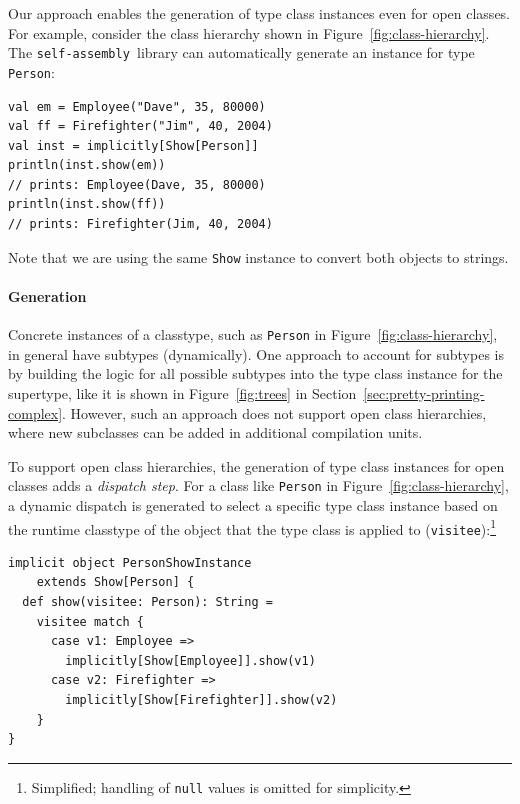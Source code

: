 \documentclass[preprint]{sigplanconf}
\newcommand{\selfassembly}{\texttt{self-assembly~}}
\begin{document}
Our approach enables the generation of type class instances even for open
classes. For example, consider the class hierarchy shown in
Figure~\ref{fig:class-hierarchy}. The \selfassembly library can automatically generate
an instance for type \verb|Person|:

\begin{lstlisting}
val em = Employee("Dave", 35, 80000)
val ff = Firefighter("Jim", 40, 2004)
val inst = implicitly[Show[Person]]
println(inst.show(em))
// prints: Employee(Dave, 35, 80000)
println(inst.show(ff))
// prints: Firefighter(Jim, 40, 2004)
\end{lstlisting}
\noindent
Note that we are using the same \verb|Show| instance to convert both objects
to strings.

\paragraph{Generation}

Concrete instances of a classtype, such as \verb|Person| in
Figure~\ref{fig:class-hierarchy}, in general have subtypes (dynamically). One approach to
account for subtypes is by building the logic for all possible subtypes into
the type class instance for the supertype, like it is shown in
Figure~\ref{fig:trees} in Section~\ref{sec:pretty-printing-complex}.
However, such an approach does not support open class hierarchies, where new subclasses can be
added in additional compilation units.

To support open class hierarchies, the generation of type class instances for
open classes adds a {\em dispatch step}. For a class like \verb|Person| in
Figure~\ref{fig:class-hierarchy}, a dynamic dispatch is generated to select a
specific type class instance based on the runtime classtype of the object that the type
class is applied to (\verb|visitee|):\footnote{Simplified; handling of \texttt{null} values is omitted for simplicity.}

\begin{lstlisting}
implicit object PersonShowInstance
    extends Show[Person] {
  def show(visitee: Person): String =
    visitee match {
      case v1: Employee =>
        implicitly[Show[Employee]].show(v1)
      case v2: Firefighter =>
        implicitly[Show[Firefighter]].show(v2)
    }
}
\end{lstlisting}

\end{document}

